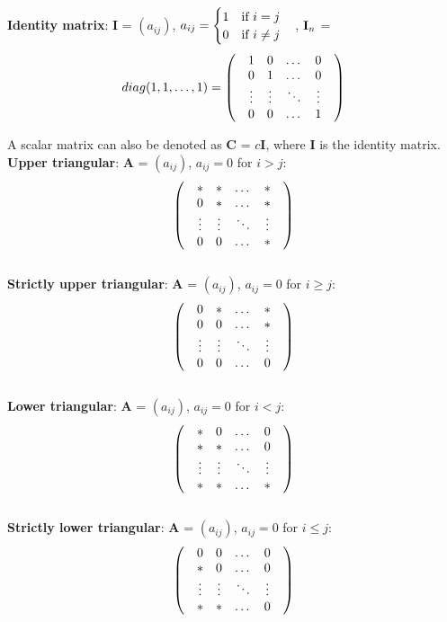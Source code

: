 \documentclass[11pt]{article}
\begin{document}
{\textbf{Identity matrix}: \textbf{I} = $(a_{ij})$, $a_{ij}=\begin{cases}1\quad \text{if } i = j\\ 0\quad \text{if } i \not=j \end{cases}$, $\mathbf{I}_{n}$ = \[ diag (1, 1, \dots, 1)= 
\left(\quad\begin{matrix}
1 & 0 & \dots & 0 \\
0 & 1 & \dots & 0 \\
\vdots & \vdots & \ddots & \vdots \\
0 & 0 & \dots & 1 \\
\end{matrix}\quad\right)\]

A scalar matrix can also be denoted as $\textbf{C}$ = $c\textbf{I}$, where \textbf{I} is the identity matrix. \\

\textbf{Upper triangular}: \textbf{A} = $(a_{ij})$, $a_{ij}=0$ for $i > j$: \[ 
\left(\quad\begin{matrix}
* & * & \dots & * \\
0 & * & \dots & * \\
\vdots & \vdots & \ddots & \vdots \\
0 & 0 & \dots & * \\
\end{matrix}\quad\right)\]\\

\textbf{Strictly upper triangular}: \textbf{A} = $(a_{ij})$, $a_{ij}=0$ for $i \geq j$: \[ 
\left(\quad\begin{matrix}
0 & * & \dots & * \\
0 & 0 & \dots & * \\
\vdots & \vdots & \ddots & \vdots \\
0 & 0 & \dots & 0 \\
\end{matrix}\quad\right)\]\\

\textbf{Lower triangular}: \textbf{A} = $(a_{ij})$, $a_{ij}=0$ for $i < j$: \[ 
\left(\quad\begin{matrix}
* & 0 & \dots & 0 \\
* & * & \dots & 0 \\
\vdots & \vdots & \ddots & \vdots \\
* & * & \dots & * \\
\end{matrix}\quad\right)\]\\

\textbf{Strictly lower triangular}: \textbf{A} = $(a_{ij})$, $a_{ij}=0$ for $i \leq j$: \[ 
\left(\quad\begin{matrix}
0 & 0 & \dots & 0 \\
* & 0 & \dots & 0 \\
\vdots & \vdots & \ddots & \vdots \\
* & * & \dots & 0 \\
\end{matrix}\quad\right)\]\\

}
\end{document}
